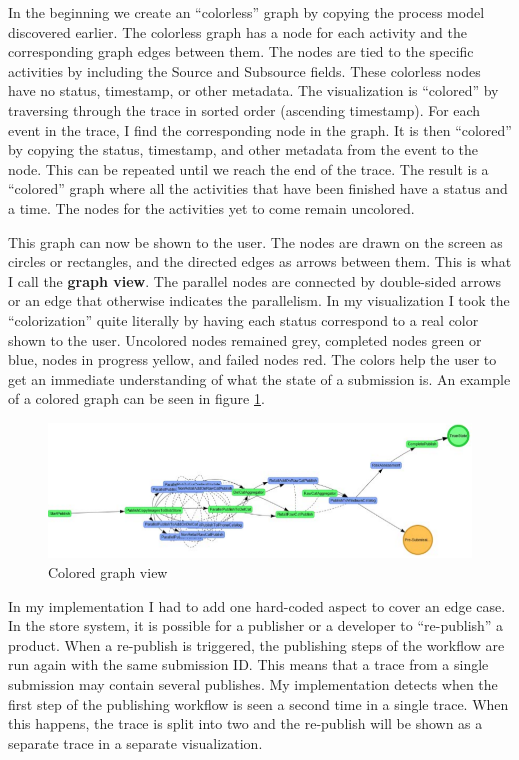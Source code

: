 In the beginning we create an ``colorless'' graph by copying the process model discovered earlier.
The colorless graph has a node for each activity and the corresponding graph edges between them.
The nodes are tied to the specific activities by including the Source and Subsource fields. 
These colorless nodes have no status, timestamp, or other metadata.
The visualization is ``colored'' by traversing through the trace in sorted order (ascending timestamp).
For each event in the trace, I find the corresponding node in the graph.
It is then ``colored'' by copying the status, timestamp, and other metadata from the event to the node.
This can be repeated until we reach the end of the trace.
The result is a ``colored'' graph where all the activities that have been finished have a status and a time.
The nodes for the activities yet to come remain uncolored.


This graph can now be shown to the user.
The nodes are drawn on the screen as circles or rectangles, and the directed edges as arrows between them.
This is what I call the \textbf{graph view}.
The parallel nodes are connected by double-sided arrows or an edge that otherwise indicates the parallelism.
In my visualization I took the ``colorization'' quite literally by having each status correspond to a real color shown to the user.
Uncolored nodes remained grey, completed nodes green or blue, nodes in progress yellow, and failed nodes red.
The colors help the user to get an immediate understanding of what the state of a submission is.
An example of a colored graph can be seen in figure \ref{fig:coloredgraph}.

\begin{figure}[htb]
    \centering \includegraphics[width=0.9\linewidth]{gfx/screenshots/graphcolor.png}
    \caption{Colored graph view}
    \label{fig:coloredgraph}
\end{figure}

In my implementation I had to add one hard-coded aspect to cover an edge case. 
In the store system, it is possible for a publisher or a developer to ``re-publish'' a product. 
When a re-publish is triggered, the publishing steps of the workflow are run again with the same submission ID. 
This means that a trace from a single submission may contain several publishes.
My implementation detects when the first step of the publishing workflow is seen a second time in a single trace. 
When this happens, the trace is split into two and the re-publish will be shown as a separate trace in a separate visualization.

